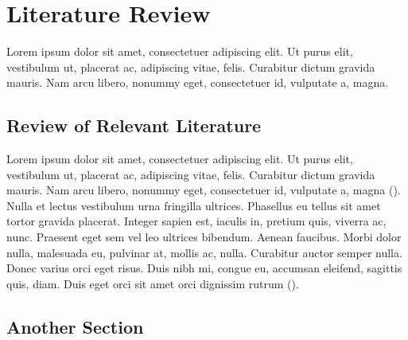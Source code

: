 
\chapter{Literature Review}

Lorem ipsum dolor sit amet, consectetuer adipiscing elit. Ut purus elit, vestibulum ut, placerat ac, adipiscing vitae, felis. Curabitur dictum gravida mauris. Nam arcu libero, nonummy eget, consectetuer id, vulputate a, magna.

\section{Review of Relevant Literature}

Lorem ipsum dolor sit amet, consectetuer adipiscing elit. Ut purus elit, vestibulum ut, placerat ac, adipiscing vitae, felis. Curabitur dictum gravida mauris. Nam arcu libero, nonummy eget, consectetuer id, vulputate a, magna (\cite{basapur2021hybrid}). \\

Nulla et lectus vestibulum urna fringilla ultrices. Phasellus eu tellus sit amet tortor gravida placerat. Integer sapien est, iaculis
in, pretium quis, viverra ac, nunc. Praesent eget sem vel leo ultrices bibendum. Aenean faucibus. Morbi dolor nulla, malesuada eu, pulvinar at, mollis ac, nulla. Curabitur auctor
semper nulla. Donec varius orci eget risus. Duis nibh mi, congue eu, accumsan eleifend, sagittis quis, diam. Duis eget orci sit amet orci dignissim rutrum (\cite{gagnidze2017analysis}).


\section{Another Section}

